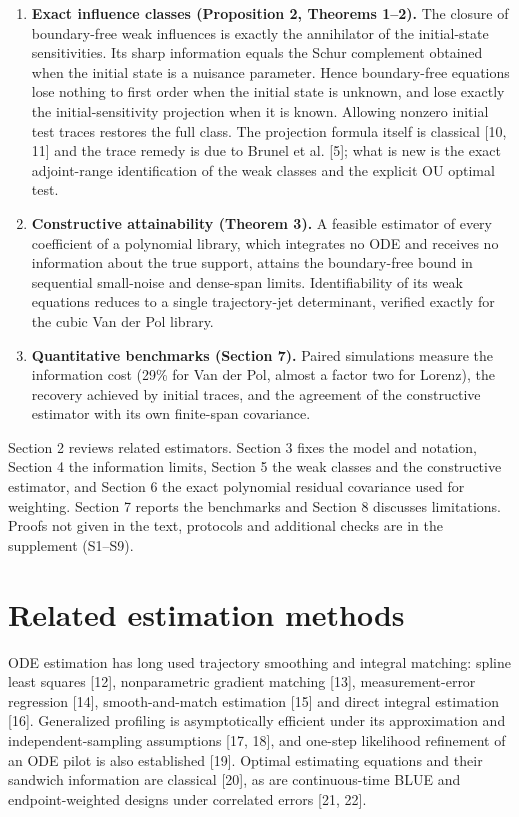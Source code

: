 \documentclass[ejs]{imsart}
\providecommand{\tightlist}{\setlength{\itemsep}{0pt}\setlength{\parskip}{0pt}}
\begin{document}
\begin{enumerate}
\def\labelenumi{\arabic{enumi}.}
\tightlist
\item
  \textbf{Exact influence classes (Proposition 2, Theorems 1--2).} The
  closure of boundary-free weak influences is exactly the annihilator of
  the initial-state sensitivities. Its sharp information equals the
  Schur complement obtained when the initial state is a nuisance
  parameter. Hence boundary-free equations lose nothing to first order
  when the initial state is unknown, and lose exactly the
  initial-sensitivity projection when it is known. Allowing nonzero
  initial test traces restores the full class. The projection formula
  itself is classical {[}10, 11{]} and the trace remedy is due to Brunel
  et al. {[}5{]}; what is new is the exact adjoint-range identification
  of the weak classes and the explicit OU optimal test.
\item
  \textbf{Constructive attainability (Theorem 3).} A feasible estimator
  of every coefficient of a polynomial library, which integrates no ODE
  and receives no information about the true support, attains the
  boundary-free bound in sequential small-noise and dense-span limits.
  Identifiability of its weak equations reduces to a single
  trajectory-jet determinant, verified exactly for the cubic Van der Pol
  library.
\item
  \textbf{Quantitative benchmarks (Section 7).} Paired simulations
  measure the information cost (29\% for Van der Pol, almost a factor
  two for Lorenz), the recovery achieved by initial traces, and the
  agreement of the constructive estimator with its own finite-span
  covariance.
\end{enumerate}

Section 2 reviews related estimators. Section 3 fixes the model and
notation, Section 4 the information limits, Section 5 the weak classes
and the constructive estimator, and Section 6 the exact polynomial
residual covariance used for weighting. Section 7 reports the benchmarks
and Section 8 discusses limitations. Proofs not given in the text,
protocols and additional checks are in the supplement (S1--S9).

\section{Related estimation
methods}\label{related-estimation-methods}

ODE estimation has long used trajectory smoothing and integral matching:
spline least squares {[}12{]}, nonparametric gradient matching {[}13{]},
measurement-error regression {[}14{]}, smooth-and-match estimation
{[}15{]} and direct integral estimation {[}16{]}. Generalized profiling
is asymptotically efficient under its approximation and
independent-sampling assumptions {[}17, 18{]}, and one-step likelihood
refinement of an ODE pilot is also established {[}19{]}. Optimal
estimating equations and their sandwich information are classical
{[}20{]}, as are continuous-time BLUE and endpoint-weighted designs
under correlated errors {[}21, 22{]}.
\end{document}

